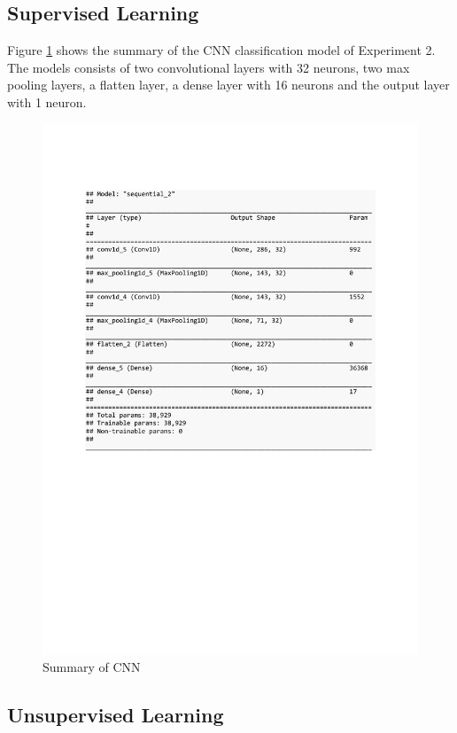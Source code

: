 \subsection{Supervised Learning}
Figure \ref{fig:CNN_classifier_house_temp} shows the summary of the CNN classification model of Experiment 2. The models consists of two convolutional layers with 32 neurons, two max pooling layers, a flatten layer, a dense layer with 16 neurons and the output layer with 1 neuron.
\begin{figure}[h]
	\centering
	\includegraphics[scale=0.5]{Figures/summary_CNN_class_house_temp}
	\decoRule
	\caption[Experiment 2: Summary of CNN for supervised learning]{Summary of CNN \parencite{own}}
	\label{fig:CNN_classifier_house_temp}
\end{figure}
\clearpage
\subsection{Unsupervised Learning}

